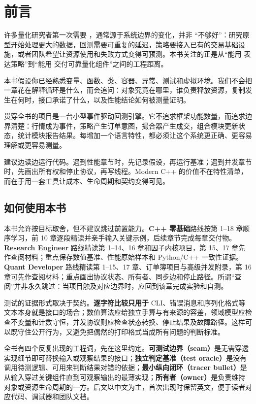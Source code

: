 \chapter*{前言}

许多量化研究者第一次需要 \cpp，通常源于系统边界的变化，并非 \python{} “不够好”：研究原型开始处理更大的数据，回测需要可重复的延迟，策略要接入已有的交易基础设施，或者团队希望让资源使用和失败方式变得可预测。本书关注的正是从“能用 \python{} 表达策略”到“能用 \cpp{} 交付可靠量化组件”之间的工程距离。

本书假设你已经熟悉变量、函数、类、容器、异常、测试和虚拟环境。我们不会把一章花在解释循环是什么，而会追问：对象究竟在哪里，谁负责释放资源，复制发生在何时，接口承诺了什么，以及性能结论如何被测量证明。

贯穿全书的项目是一台小型事件驱动回测引擎。它不追求框架功能数量，而追求边界清楚：行情成为事件，策略产生订单意图，撮合器产生成交，组合模块更新状态，统计模块报告结果。每增加一个语言特性，都必须让这个系统更正确、更容易理解或更容易测量。

建议边读边运行代码。遇到性能章节时，先记录假设，再运行基准；遇到并发章节时，先画出所有权和停止协议，再写线程。Modern C++ 的价值不在特性清单，而在于用一套工具让成本、生命周期和契约变得可见。

\section*{如何使用本书}

本书允许按目标取舍，但不建议跳过前置能力。\textbf{C++ 零基础}路线按第 1--18 章顺序学习，前 10 章逐段精读并亲手输入关键示例，后续章节完成每章交付物。\textbf{Research Engineer} 路线精读第 1--14、16 章和因子内核项目，第 15、17 章先作查阅材料；重点保存数值基准、性能原始样本和 Python/C++ 一致性证据。\textbf{Quant Developer} 路线精读第 1--15、17 章、订单簿项目与高级并发附录，第 16 章可先作查阅材料；重点画出协议状态、所有者、同步边和停止路径。所谓“查阅”并非永久跳过：当项目触及对应边界时，应回到该章完成实验和自测。

测试的证据形式取决于契约。\textbf{逐字符比较只用于} CLI、错误消息和序列化格式等文本本身就是接口的场合；数值算法应给独立手算与有来源的容差，领域模型应检查不变量和计数守恒，并发协议则应检查状态转换、停止结果及故障路径。这样可以既守住公开行为，又避免把偶然的打印格式当成所有问题的判断标准。

全书有四个反复出现的工程词，先在这里约定。\textbf{可测试边界（seam）}是无需穿透实现细节即可替换输入或观察结果的接口；\textbf{独立判定基准（test oracle）}是没有调用待测逻辑、可用来判断结果对错的依据；\textbf{最小纵向闭环（tracer bullet）}是从输入穿过关键组件直到可观察输出的最薄实现；\textbf{所有者（owner）}是负责维持对象或资源生命周期的一方。后文以中文为主，首次出现时保留英文，便于读者对应代码、调试器和团队文档。
